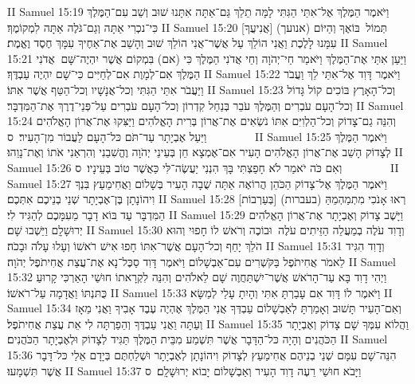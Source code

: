 II Samuel 15:19	וַיֹּאמֶר הַמֶּלֶךְ אֶל־אִתַּי הַגִּתִּי לָמָּה תֵלֵךְ גַּם־אַתָּה אִתָּנוּ שׁוּב וְשֵׁב עִם־הַמֶּלֶךְ כִּי־נכְרִי אַתָּה וְגַם־גֹּלֶה אַתָּה לִמְקוֹמֶךָ׃
II Samuel 15:20	תְּמוֹל  בּוֹאֶךָ וְהַיּוֹם (אנועך) [אֲנִיעֲךָ] עִמָּנוּ לָלֶכֶת וַאֲנִי הוֹלֵךְ עַל אֲשֶׁר־אֲנִי הוֹלֵךְ שׁוּב וְהָשֵׁב אֶת־אַחֶיךָ עִמָּךְ חֶסֶד וֶאֱמֶת׃
II Samuel 15:21	וַיַּעַן אִתַּי אֶת־הַמֶּלֶךְ וַיֹּאמַר חַי־יְהֹוָה וְחֵי אֲדֹנִי הַמֶּלֶךְ כִּי (אם) בִּמְקוֹם אֲשֶׁר יִהְיֶה־שָּׁם  אֲדֹנִי הַמֶּלֶךְ אִם־לְמָוֶת אִם־לְחַיִּים כִּי־שָׁם יִהְיֶה עַבְדֶּךָ׃
II Samuel 15:22	וַיֹּאמֶר דָּוִד אֶל־אִתַּי לֵךְ וַעֲבֹר וַיַּעֲבֹר אִתַּי הַגִּתִּי וְכל־אֲנָשָׁיו וְכל־הַטַּף אֲשֶׁר אִתּוֹ׃
II Samuel 15:23	וְכל־הָאָרֶץ בּוֹכִים קוֹל גָּדוֹל וְכל־הָעָם עֹבְרִים וְהַמֶּלֶךְ עֹבֵר בְּנַחַל קִדְרוֹן וְכל־הָעָם עֹבְרִים עַל־פְּנֵי־דֶרֶךְ אֶת־הַמִּדְבָּר׃
II Samuel 15:24	וְהִנֵּה גַם־צָדוֹק וְכל־הַלְוִיִּם אִתּוֹ נֹשְׂאִים אֶת־אֲרוֹן בְּרִית הָאֱלֹהִים וַיַּצִּקוּ אֶת־אֲרוֹן הָאֱלֹהִים וַיַּעַל אֶבְיָתָר עַד־תֹּם כּל־הָעָם לַעֲבוֹר מִן־הָעִיר׃ {ס}        
II Samuel 15:25	וַיֹּאמֶר הַמֶּלֶךְ לְצָדוֹק הָשֵׁב אֶת־אֲרוֹן הָאֱלֹהִים הָעִיר אִם־אֶמְצָא חֵן בְּעֵינֵי יְהֹוָה וֶהֱשִׁבַנִי וְהִרְאַנִי אֹתוֹ וְאֶת־נָוֵהוּ׃
II Samuel 15:26	וְאִם כֹּה יֹאמַר לֹא חָפַצְתִּי בָּךְ הִנְנִי יַעֲשֶׂה־לִּי כַּאֲשֶׁר טוֹב בְּעֵינָיו׃ {ס}        
II Samuel 15:27	וַיֹּאמֶר הַמֶּלֶךְ אֶל־צָדוֹק הַכֹּהֵן הֲרוֹאֶה אַתָּה שֻׁבָה הָעִיר בְּשָׁלוֹם וַאֲחִימַעַץ בִּנְךָ וִיהוֹנָתָן בֶּן־אֶבְיָתָר שְׁנֵי בְנֵיכֶם אִתְּכֶם׃
II Samuel 15:28	רְאוּ אָנֹכִי מִתְמַהְמֵהַּ (בעברות) [בְּעַרְבוֹת] הַמִּדְבָּר עַד בּוֹא דָבָר מֵעִמָּכֶם לְהַגִּיד לִי׃
II Samuel 15:29	וַיָּשֶׁב צָדוֹק וְאֶבְיָתָר אֶת־אֲרוֹן הָאֱלֹהִים יְרוּשָׁלָ͏ִם וַיֵּשְׁבוּ שָׁם׃
II Samuel 15:30	וְדָוִד עֹלֶה בְמַעֲלֵה הַזֵּיתִים עֹלֶה  וּבוֹכֶה וְרֹאשׁ לוֹ חָפוּי וְהוּא הֹלֵךְ יָחֵף וְכל־הָעָם אֲשֶׁר־אִתּוֹ חָפוּ אִישׁ רֹאשׁוֹ וְעָלוּ עָלֹה וּבָכֹה׃
II Samuel 15:31	וְדָוִד הִגִּיד לֵאמֹר אֲחִיתֹפֶל בַּקֹּשְׁרִים עִם־אַבְשָׁלוֹם וַיֹּאמֶר דָּוִד סַכֶּל־נָא אֶת־עֲצַת אֲחִיתֹפֶל יְהֹוָה׃
II Samuel 15:32	וַיְהִי דָוִד בָּא עַד־הָרֹאשׁ אֲשֶׁר־יִשְׁתַּחֲוֶה שָׁם לֵאלֹהִים וְהִנֵּה לִקְרָאתוֹ חוּשַׁי הָאַרְכִּי קָרוּעַ כֻּתּנְתּוֹ וַאֲדָמָה עַל־רֹאשׁוֹ׃
II Samuel 15:33	וַיֹּאמֶר לוֹ דָּוִד אִם עָבַרְתָּ אִתִּי וְהָיִתָ עָלַי לְמַשָּׂא׃
II Samuel 15:34	וְאִם־הָעִיר תָּשׁוּב וְאָמַרְתָּ לְאַבְשָׁלוֹם עַבְדְּךָ אֲנִי הַמֶּלֶךְ אֶהְיֶה עֶבֶד אָבִיךָ וַאֲנִי מֵאָז וְעַתָּה וַאֲנִי עַבְדֶּךָ וְהֵפַרְתָּה לִי אֵת עֲצַת אֲחִיתֹפֶל׃
II Samuel 15:35	וַהֲלוֹא עִמְּךָ שָׁם צָדוֹק וְאֶבְיָתָר הַכֹּהֲנִים וְהָיָה כּל־הַדָּבָר אֲשֶׁר תִּשְׁמַע מִבֵּית הַמֶּלֶךְ תַּגִּיד לְצָדוֹק וּלְאֶבְיָתָר הַכֹּהֲנִים׃
II Samuel 15:36	הִנֵּה־שָׁם עִמָּם שְׁנֵי בְנֵיהֶם אֲחִימַעַץ לְצָדוֹק וִיהוֹנָתָן לְאֶבְיָתָר וּשְׁלַחְתֶּם בְּיָדָם אֵלַי כּל־דָּבָר אֲשֶׁר תִּשְׁמָעוּ׃
II Samuel 15:37	וַיָּבֹא חוּשַׁי רֵעֶה דָוִד הָעִיר וְאַבְשָׁלוֹם יָבוֹא יְרוּשָׁלָ͏ִם׃ {ס}        
